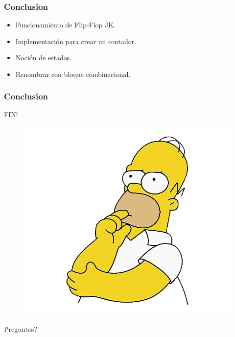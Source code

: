 \documentclass[10pt]{beamer}
\begin{document}
\begin{frame}
{\begin{figure}[h!]
\end{figure}}


\end{frame}
\begin{frame}
\frametitle{Conclusion}
\begin{itemize}
  \item Funcionamiento de Flip-Flop JK.\pause
  \item Implementación para crear un contador.\pause
  \item Noción de estados.\pause
  \item Renombrar con bloque combinacional.
\end{itemize}

\end{frame}

\begin{frame}
\frametitle{Conclusion}
\huge
\centering

FIN!

\begin{figure}[h!]
    \centering
    \includegraphics[scale=0.15]{homero.png}
\end{figure}
Preguntas?

\end{frame}
\end{document}
